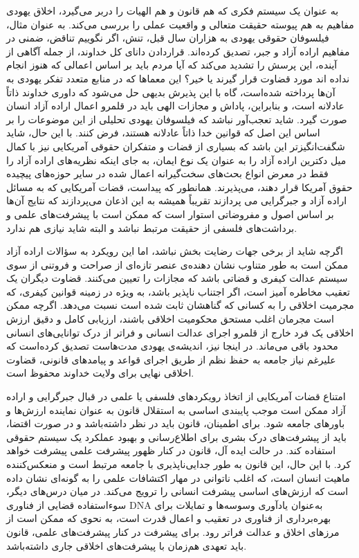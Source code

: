 به عنوان یک سیستم فکری که هم قانون و هم الهیات را در‌بر می‌گیرد، اخلاق یهودی مفاهیم به هم پیوسته حقیقت متعالی و واقعیت عملی را بررسی می‌کند.
به عنوان مثال، فیلسوفان حقوقی یهودی به هزاران سال قبل، تنش، اگر نگوییم تناقض، ضمنی در مفاهیم اراده آزاد و جبر، تصدیق کرده‌اند.
قرار‌دادن دانای کل خداوند، از جمله آگاهی از آینده، این پرسش را تشدید می‌کند که آیا مردم باید بر اساس اعمالی که هنوز انجام نداده اند مورد قضاوت قرار گیرند یا خیر؟ این معماها که در منابع متعدد تفکر یهودی به آن‌ها پرداخته شده‌است، گاه با این پذیرش بدیهی حل می‌شود که داوری خداوند ذاتاً عادلانه است، و بنابراین، پاداش و مجازات الهی باید در قلمرو اعمال اراده آزاد انسان صورت گیرد.
شاید تعجب‌آور نباشد که فیلسوفان یهودی تحلیلی از این موضوعات را بر اساس این اصل که قوانین خدا ذاتاً عادلانه هستند، فرض کنند.
با این حال، شاید شگفت‌انگیزتر این باشد که بسیاری از قضات و متفکران حقوقی آمریکایی نیز با کمال میل دکترین اراده آزاد را به عنوان یک نوع ایمان، به جای اینکه نظریه‌های اراده آزاد را فقط در معرض انواع بحث‌های سخت‌گیرانه اعمال شده در سایر حوزه‌های پیچیده حقوق آمریکا قرار دهند، می‌پذیرند.
همانطور که پیداست، قضات آمریکایی که به مسائل اراده آزاد و جبرگرایی می پردازند تقریباً همیشه به این اذعان می‌پردازند که نتایج آن‌ها بر اساس اصول و مفروضاتی استوار است که ممکن است با پیشرفت‌های علمی و برداشت‌های فلسفی از حقیقت مرتبط نباشد و البته شاید نیازی هم ندارد.

اگرچه شاید از برخی جهات رضایت بخش نباشد، اما این رویکرد به سؤالات اراده آزاد ممکن است به طور متناوب نشان دهنده‌ی عنصر تازه‌ای از صراحت و فروتنی از سوی سیستم عدالت کیفری و قضاتی باشد که مجازات را تعیین می‌کنند.
قضاوت دیگران یک تعقیب مخاطره آمیز است، اگر اجتناب ناپذیر باشد، به ویژه در زمینه قوانین کیفری، که مجرمیت اخلاقی را به کسانی که گناهشان ثابت شده است نسبت می‌دهد.
اگرچه ممکن است مجرمان اغلب مستحق محکومیت اخلاقی باشند، ارزیابی کامل و دقیق ارزش اخلاقی یک فرد خارج از قلمرو اجرای عدالت انسانی و فراتر از درک توانایی‌های انسانی محدود باقی می‌ماند.
در اینجا نیز، اندیشه‌ی یهودی مدت‌هاست تصدیق کرده‌است که علیرغم نیاز جامعه به حفظ نظم از طریق اجرای قواعد و پیامدهای قانونی، قضاوت اخلاقی نهایی برای ولایت خداوند محفوظ است.

امتناع قضات آمریکایی از اتخاذ رویکردهای فلسفی یا علمی در قبال جبرگرایی و اراده آزاد ممکن است موجب پایبندی اساسی به استقلال قانون به عنوان نماینده ارزش‌ها و باورهای جامعه شود.
برای اطمینان، قانون باید در نظر داشته‌باشد و در صورت اقتضا، باید از پیشرفت‌های درک بشری برای اطلاع‌رسانی و بهبود عملکرد یک سیستم حقوقی استفاده کند.
در حالت ایده آل، قانون در کنار ظهور پیشرفت علمی پیشرفت خواهد کرد.
با این حال، این قانون به طور جدایی‌ناپذیری با جامعه مرتبط است و منعکس‌کننده ماهیت انسان است، که اغلب ناتوانی در مهار اکتشافات علمی را به گونه‌ای نشان داده است که ارزش‌های اساسی پیشرفت انسانی را ترویج می‌کند.
در میان درس‌های دیگر، سوء‌استفاده قضایی از فناوری DNA به‌عنوان یادآوری وسوسه‌ها و تمایلات برای بهره‌برداری از فناوری در تعقیب و اعمال قدرت است، به نحوی که ممکن است از مرزهای اخلاق و عدالت فراتر رود.
برای پیشرفت در کنار پیشرفت‌های علمی، قانون باید تعهدی هم‌زمان با پیشرفت‌های اخلاقی جاری داشته‌باشد.
\newline
\newline

